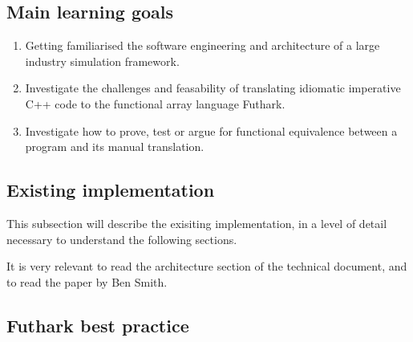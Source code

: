\subsection*{Main learning goals}
\begin{enumerate}
\item Getting familiarised the software engineering and architecture of a large industry simulation framework.
\item Investigate the challenges and feasability of translating idiomatic imperative C++ code to the functional array language Futhark.
\item Investigate how to prove, test or argue for functional equivalence between a program and its manual translation.
\end{enumerate}

\subsection{Existing implementation}
This subsection will describe the exisiting implementation, in a level of detail necessary to understand the following sections.


It is very relevant to read the architecture section of the technical document, and to read the paper by Ben Smith.

\subsection{Futhark best practice}
